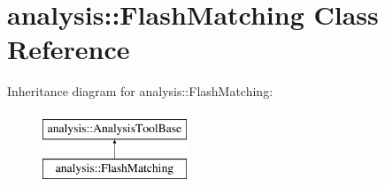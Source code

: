 \hypertarget{classanalysis_1_1FlashMatching}{}\section{analysis\+:\+:Flash\+Matching Class Reference}
\label{classanalysis_1_1FlashMatching}
Inheritance diagram for analysis\+:\+:Flash\+Matching\+:\begin{figure}[H]
\begin{center}
\leavevmode
\includegraphics[height=2.000000cm]{classanalysis_1_1FlashMatching}
\end{center}
\end{figure}
